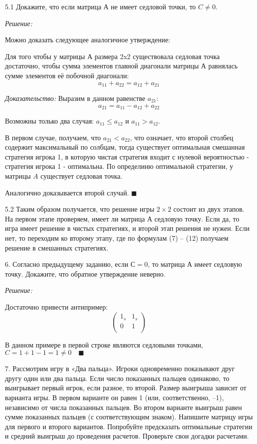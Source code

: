 \documentclass[aps,%
12pt,%
final,%
oneside,
onecolumn,%
musixtex, %
superscriptaddress,%
centertags]{article} %
\begin{document}
5.1 Докажите, что если матрица А не имеет седловой точки, то $C \neq 0$. 

\textit{Решение:}

Можно доказать следующее аналогичное утверждение:

Для того чтобы у матрицы А размера 2x2 существовала седловая точка достаточно, чтобы сумма элементов главной диагонали матрицы А равнялась сумме элементов её побочной диагонали:
$$a_{11} + a_{22} = a_{12} + a_{21}$$

\textit{Доказательство:}
Выразим в данном равенстве $a_{21}$:
$$a_{21} = a_{11} - a_{12} +a_{22}$$

Возможны только два случая: $a_{11} \leq a_{12}$ и $a_{11} > a_{12}$.

В первом случае, получаем, что $a_{21} < a_{22}$, что означает, что второй столбец содержит максимальный по солбцам, тогда существует оптимальная смешанная стратегия игрока 1, в которую чистая стратегия входит с нулевой вероятностью - стратегия игрока 1 - оптимальна. По определиню оптимальной стратегии, у матрицы $A$ существует седловая точка.

Аналогично доказывается второй случай. $\blacksquare$


5.2 Таким образом получается, что решение игры $2 \times 2$ состоит из двух этапов. На первом этапе проверяем, имеет ли матрица А седловую точку. Если да, то игра имеет решение в чистых стратегиях, и второй этап решения не нужен. Если нет, то переходим ко второму этапу, где по формулам (7) – (12) получаем решение в смешанных стратегиях.

6.  Согласно предыдущему заданию, если $С = 0$, то матрица А имеет седловую точку. Докажите, что обратное утверждение неверно.

\textit{Решение:}

Достаточно привести антипример:
$$
\begin{pmatrix}
1_{s} & 1_{s} \\
0 & 1 \\
\end{pmatrix}
$$

В данном примере в первой строке являются седловыми точками, $C = 1+1 -1 = 1 \neq 0 \quad \blacksquare$

7.  Рассмотрим игру в «Два пальца». Игроки одновременно показывают друг другу один или два пальца. Если число показанных пальцев одинаково, то выигрывает первый игрок, если разное, то второй. Размер выигрыша зависит от варианта игры. В первом варианте он равен 1 (или, соответственно, –1), независимо от числа показанных пальцев. Во втором варианте выигрыш равен сумме показанных пальцев (с соответствующим знаком). Напишите матрицу игры для первого и второго вариантов. Попробуйте предсказать оптимальные стратегии и средний выигрыш до проведения расчетов. Проверьте свои догадки расчетами.
\end{document}
